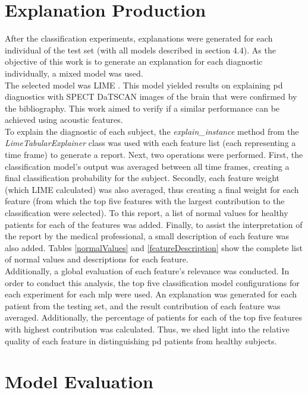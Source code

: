 \section{Explanation Production}

After the classification experiments, explanations were generated for each individual of the test set (with all models described in section 4.4). As the objective of this work is to generate an explanation for each diagnostic individually, a mixed model was used.
\\
The selected model was LIME \cite{LIME}. This model yielded results on explaining \gls{pd} diagnostics with SPECT DaTSCAN images of the brain that were confirmed by the bibliography. This work aimed to verify if a similar performance can be achieved using acoustic features.
\\
To explain the diagnostic of each subject, the \textit{explain\_instance} method from the \textit{LimeTabularExplainer} class was used with each feature list (each representing a time frame) to generate a report. Next, two operations were performed. First, the classification model's output was averaged between all time frames, creating a final classification probability for the subject. Secondly, each feature weight (which LIME calculated) was also averaged, thus creating a final weight for each feature (from which the top five features with the largest contribution to the classification were selected). To this report, a list of normal values for healthy patients for each of the features was added. Finally, to assist the interpretation of the report by the medical professional, a small description of each feature was also added. Tables \ref{normalValues} and \ref{featureDescription} show the complete list of normal values and descriptions for each feature.
\\
Additionally, a global evaluation of each feature's relevance was conducted. In order to conduct this analysis, the top five classification model configurations for each experiment for each \gls{mlp} were used. An explanation was generated for each patient from the testing set, and the result contribution of each feature was averaged. Additionally, the percentage of patients for each of the top five features with highest contribution was calculated. Thus, we shed light into the relative quality of each feature in distinguishing \gls{pd} patients from healthy subjects.

\section{Model Evaluation}

